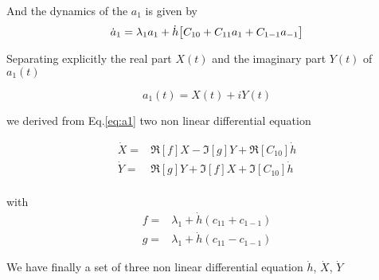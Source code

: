 \documentclass[a4paper,12pt,twoside]{article}
\begin{document}
And the dynamics of the $a_1$ is given by
\begin{equation}
\label{eq:a1}
\dot{a}_1=\lambda_1 a_1 + \dot{h}\big[C_{10}+C_{11}a_1+C_{1-1}a_{-1}\big] \nonumber \\
\end{equation}

Separating explicitly the real part $X(t)$ and the imaginary part  $Y(t)$ of $a_1(t)$

\begin{equation}
\label{eq:a1xy}
a_1(t)= X(t) +i Y(t)
\end{equation}

we derived from Eq.\eqref{eq:a1}  two non linear differential equation

\begin{align}
\dot{X}=&\Re[f]X-\Im[g]Y +\Re[C_{10}]\dot{h}\\
\dot{Y}=&\Re[g]Y+\Im[f]X +\Im[C_{10}]\dot{h}\\
\end{align}

with
\begin{align}
f=&\lambda_1+ \dot{h}(c_{11}+c_{1-1})\\
g=&\lambda_1+ \dot{h}(c_{11}-c_{1-1})
\end{align}

We have finally a set of three non linear differential equation $\dot{h}$, $\dot{X}$, $\dot{Y}$
\end{document}
